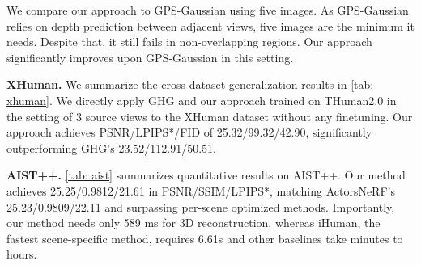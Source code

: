 We compare our approach to GPS-Gaussian using five images. As GPS-Gaussian relies on depth prediction between adjacent views, five images are the minimum it needs. Despite that, it still fails in non-overlapping regions. Our approach significantly improves upon GPS-Gaussian in this setting.





\textbf{XHuman.} We summarize the cross-dataset generalization results in \cref{tab: xhuman}. We directly apply GHG and our approach trained on THuman2.0 in the setting of 3 source views to the XHuman dataset without any finetuning. Our approach achieves PSNR/LPIPS*/FID of 25.32/99.32/42.90, significantly outperforming GHG's 23.52/112.91/50.51.

{\bf AIST++.} 
\cref{tab: aist} summarizes quantitative results on AIST++. Our method achieves 25.25/0.9812/21.61 in PSNR/SSIM/LPIPS*, matching ActorsNeRF's 25.23/0.9809/22.11 and surpassing per-scene optimized methods. Importantly, our method needs only 589 ms for 3D reconstruction, whereas iHuman, the fastest scene-specific method, requires 6.61s and other baselines take minutes to hours.



